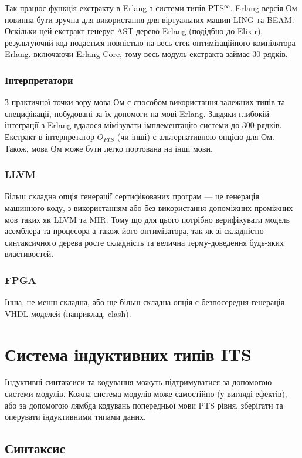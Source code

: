 Так працює функція екстракту в Erlang з системи типів PTS$^\infty$.
Erlang-версія Ом повинна бути зручна для використання для
віртуальних машин LING та BEAM. Оскільки цей екстракт генерує
AST дерево Erlang (подідбно до Elixir), результуючий код
подається повністью на весь стек оптимізаційного компілятора
Erlang. включаючи Erlang Core, тому весь модуль екстракта займає 30 рядків.

\subsubsection{Інтерпретатори}
З практичної точки зору мова Ом є способом використання залежних типів
та специфікації, побудовані за їх допомоги на мові Erlang.
Завдяки глибокій інтеграції з Erlang вдалося мімізувати імплементацію системи до 300 рядків.
Екстракт в інтерпретатор $O_{PTS}$ (чи інші) є альтернативною опцією для Ом.
Також, мова Ом може бути легко портована на інші мови.

\subsubsection{LLVM}
Більш складна опція генерації сертифікованих програм --- це генерація машинного коду,
з використанням або без використання допоміжних проміжних мов таких як LLVM та MIR.
Тому що для цього потрібно верифікувати модель асемблера та процесора а також
його оптимізатора, так як зі складністю синтаксичного дерева росте складність
та велична терму-доведення будь-яких властивостей.

\subsubsection{FPGA}
Інша, не менш складна, або ще більш складна опція є безпосередня генерація
VHDL моделей (наприклад, clash).

\section{Система індуктивних типів ITS}
Індуктивні синтаксиси та кодування можуть підтримуватися за допомогою системи модулів.
Кожна система модулів може самостійно (у вигляді ефектів), або за допомогою лямбда кодувань
попередньої мови PTS рівня, зберігати та оперувати індуктивними типами даних.

\subsection{Синтаксис}

